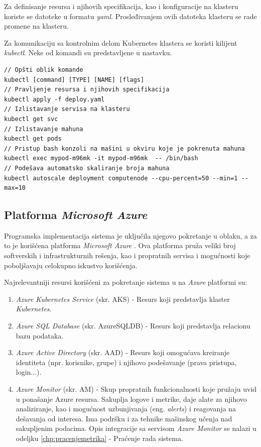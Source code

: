 \documentclass[12pt,oneside]{memoir}
\begin{document}
Za definisanje resursa i njihovih specifikacija, kao i konfiguracije na klasteru koriste se datoteke u formatu \emph{yaml}. Prosleđivanjem ovih datoteka klasteru se rade promene na klasteru.

Za komunikaciju sa kontrolnim delom Kubernetes klastera se koristi kilijent \emph{kubectl}. Neke od komandi su predstavljene u nastavku.

\begin{verbatim}
// Opšti oblik komande
kubectl [command] [TYPE] [NAME] [flags]
// Pravljenje resursa i njihovih specifikacija
kubectl apply -f deploy.yaml
// Izlistavanje servisa na klasteru
kubectl get svc
// Izlistavanje mahuna
kubectl get pods
// Pristup bash konzoli na mašini u okviru koje je pokrenuta mahuna
kubectl exec mypod-m96mk -it mypod-m96mk  -- /bin/bash
// Podešava automatsko skaliranje broja mahuna
kubectl autoscale deployment computenode --cpu-percent=50 --min=1 --max=10
\end{verbatim}

\subsection{Platforma \emph{Microsoft Azure}}
\label{sub:azureplatform}

Programska implementacija sistema je uključila njegovo pokretanje u oblaku, a za to je korišćena platforma \emph{Microsoft Azure} \cite{Azure}. Ova platforma pruža veliki broj softverskih i infrastrukturnih rešenja, kao i propratnih servisa i mogućnosti koje poboljšavaju celokupno iskustvo korišćenja.

Najrelevantniji resursi korišćeni za pokretanje sistema u na \emph{Azure} platformi su:
\begin{enumerate}
\item \emph{Azure Kubernetes Service} (skr. AKS) \cite{AKS} - Resurs koji predstavlja klaster \emph{Kubernetes}.
\item \emph{Azure SQL Database} (skr. AzureSQLDB) \cite{AzureSQLDB} - Resurs koji predstavlja relacionu bazu podataka.
\item \emph{Azure Active Directory} \cite{AAD} (skr. AAD) - Resurs koji omogućava kreiranje identiteta (npr. korisnike, grupe) i njihovo podešavanje (prava pristupa, login...).
\item \emph{Azure Monitor} (skr. AM) \cite{AzureMonitor} - Skup propratnih funkcionalnosti koje pružaju uvid u ponašanje Azure resursa. Sakuplja logove i metrike, daje alate za njihovo analiziranje, kao i mogućnost uzbunjivanja (eng. \emph{alerts}) i reagovanja na dešavanja od interesa. Ima podršku i za tehnike mašinskog učenja nad sakupljenim podacima. Opis integracije sa servisom \emph{Azure Monitor} se nalazi u odeljku \ref{chp:pracenjemetrika} - Praćenje rada sistema.
\end{enumerate}
\end{document}

